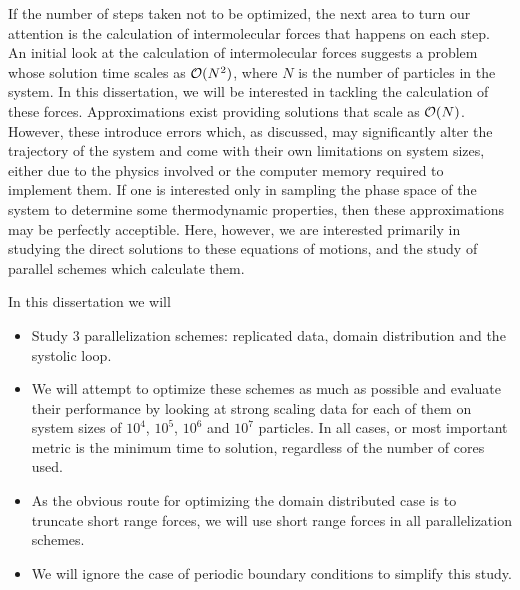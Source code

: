 If the number of steps taken not to be optimized,
the next area to turn our attention is
the calculation of intermolecular forces that happens on each step.
%
An initial look at the calculation of intermolecular forces suggests
a problem whose solution time scales as $\mathcal{O}{(N^2)}$, where $N$ is the
number of particles in the system.
%
In this dissertation, we will be interested in tackling the calculation
of these forces.
%
Approximations exist providing solutions that scale as $\mathcal{O}{(N)}$.
%
However, these introduce errors which, as discussed,
may significantly alter the trajectory of the system and come with
their own limitations on system sizes, either due to the physics involved or
the computer memory required to implement them.
%
If one is interested only in sampling the phase space of the system
to determine some thermodynamic properties, then these approximations
may be perfectly acceptible.
%
Here, however, we are interested primarily in studying the direct
solutions to these equations of motions, and the study of parallel schemes
which calculate them.

In this dissertation we will
\begin{itemize}
\item
    Study 3 parallelization schemes: replicated data, domain distribution
    and the systolic loop.

\item
    We will attempt to optimize these schemes as much as possible
    and evaluate their performance by looking at strong scaling
    data for each of them on system sizes of $10^4$, $10^5$, $10^6$ and
    $10^7$ particles. In all cases, or most important metric is the minimum
    time to solution, regardless of the number of cores used.

\item
    As the obvious route for optimizing the domain distributed case is to
    truncate short range forces, we will use short range forces in all
    parallelization schemes.

\item
    We will ignore the case of periodic boundary conditions to
    simplify this study.
\end  {itemize}
